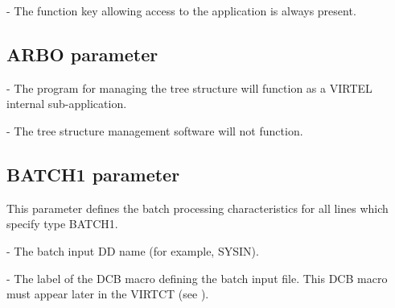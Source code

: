 \documentclass[letterpaper,10pt,english]{sphinxmanual}
\begin{document}
 - The function key allowing access to the application is always present.

\ignorespaces 

\subsection{ARBO parameter}
\label{\detokenize{Installation_Guide:arbo-parameter}}\label{\detokenize{Installation_Guide:index-37}}
\begin{sphinxVerbatim}[commandchars=\\\{\}]
 
\end{sphinxVerbatim}

 - The program for managing the tree structure will function as a VIRTEL internal sub-application.

 - The tree structure management software will not function.

\ignorespaces 

\subsection{BATCH1 parameter}
\label{\detokenize{Installation_Guide:batch1-parameter}}\label{\detokenize{Installation_Guide:index-38}}
\begin{sphinxVerbatim}[commandchars=\\\{\}]
   
\end{sphinxVerbatim}

This parameter defines the batch processing characteristics for all lines which specify type BATCH1.

 - The batch input DD name (for example, SYSIN).

 - The label of the DCB macro defining the batch input file. This DCB macro must appear later in the VIRTCT (see {\hyperref[\detokenize{Installation_Guide:vvrrig-bookmark72}]{}}).
\end{document}
